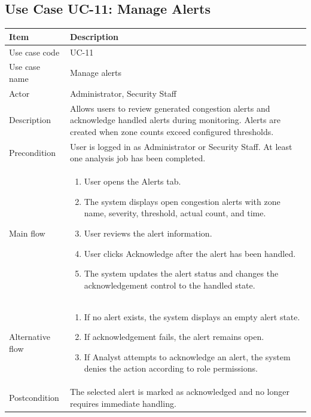 \documentclass[12pt,a4paper]{report}
\begin{document}
\subsection{Use Case UC-11: Manage Alerts}
\begin{longtable}{|p{3.6cm}|p{10.4cm}|}
\hline
\rowcolor{HeaderBlue}\textbf{Item} & \textbf{Description} \\
\hline
Use case code & UC-11 \\
\hline
Use case name & Manage alerts \\
\hline
Actor & Administrator, Security Staff \\
\hline
Description & Allows users to review generated congestion alerts and acknowledge handled alerts during monitoring. Alerts are created when zone counts exceed configured thresholds. \\
\hline
Precondition & User is logged in as Administrator or Security Staff. At least one analysis job has been completed. \\
\hline
Main flow &
\begin{enumerate}
    \item User opens the Alerts tab.
    \item The system displays open congestion alerts with zone name, severity, threshold, actual count, and time.
    \item User reviews the alert information.
    \item User clicks Acknowledge after the alert has been handled.
    \item The system updates the alert status and changes the acknowledgement control to the handled state.
\end{enumerate} \\
\hline
Alternative flow &
\begin{enumerate}
    \item If no alert exists, the system displays an empty alert state.
    \item If acknowledgement fails, the alert remains open.
    \item If Analyst attempts to acknowledge an alert, the system denies the action according to role permissions.
\end{enumerate} \\
\hline
Postcondition & The selected alert is marked as acknowledged and no longer requires immediate handling. \\
\hline
\end{longtable}
\end{document}
